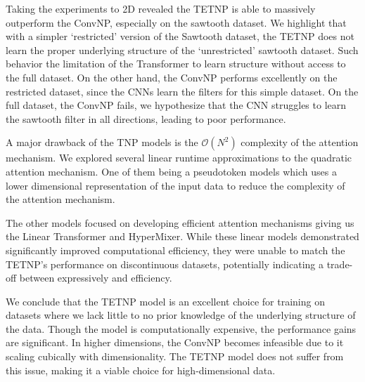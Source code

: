 \documentclass[../../main.tex]{subfiles}
\begin{document}
Taking the experiments to 2D revealed the TETNP is able to massively outperform the ConvNP, especially on the sawtooth dataset. We highlight that with a simpler `restricted' version of the Sawtooth dataset, the TETNP does not learn the proper underlying structure of the `unrestricted' sawtooth dataset. Such behavior the limitation of the Transformer to learn structure without access to the full dataset. On the other hand, the ConvNP performs excellently on the restricted dataset, since the CNNs learn the filters for this simple dataset. On the full dataset, the ConvNP fails, we hypothesize that the CNN struggles to learn the sawtooth filter in all directions, leading to poor performance.

A major drawback of the TNP models is the $\mathcal{O}(N^2)$ complexity of the attention mechanism. We explored several linear runtime approximations to the quadratic attention mechanism. One of them being a  pseudotoken models which uses a lower dimensional representation of the input data to reduce the complexity of the attention mechanism. 

The other models focused on developing efficient attention mechanisms giving us the Linear Transformer and HyperMixer. While these linear models demonstrated significantly improved computational efficiency, they were unable to match the TETNP's performance on discontinuous datasets, potentially indicating a trade-off between expressively and efficiency. 

We conclude that the TETNP model is an excellent choice for training on datasets where we lack little to no prior knowledge of the underlying structure of the data. Though the model is computationally expensive, the performance gains are significant. In higher dimensions, the ConvNP becomes infeasible due to it scaling cubically with dimensionality. The TETNP model does not suffer from this issue, making it a viable choice for high-dimensional data.

\ifSubfilesClassLoaded{%
    \printbibliography{}
}{} 
\end{document}
